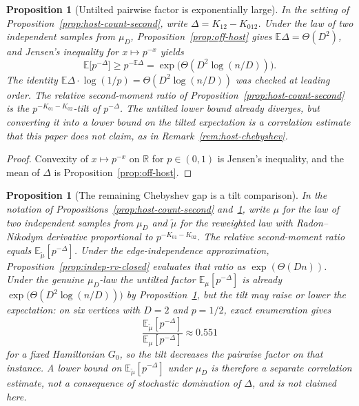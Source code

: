 \documentclass[11pt]{article}
\newtheorem{proposition}[theorem]{Proposition}
\newcommand{\EE}{\mathbb{E}}
\begin{document}
\begin{proposition}[Untilted pairwise factor is exponentially large]
\label{prop:untilted-tilt}
In the setting of Proposition~\ref{prop:host-count-second}, write
\(\Delta=K_{12}-K_{012}\).
Under the law of two independent samples from \(\mu_D\),
Proposition~\ref{prop:off-host} gives \(\EE\Delta=\Theta(D^2)\), and Jensen's
inequality for \(x\mapsto p^{-x}\) yields
\[
\EE\bigl[p^{-\Delta}\bigr]
\ge
p^{-\EE\Delta}
=
\exp\bigl(\Theta(D^2\log(n/D))\bigr).
\]
The identity \(\EE\Delta\cdot\log(1/p)=\Theta(D^2\log(n/D))\) was checked at
leading order.
The relative second-moment ratio of Proposition~\ref{prop:host-count-second}
is the \(p^{-K_{01}-K_{02}}\)-tilt of \(p^{-\Delta}\).
The untilted lower bound already diverges, but converting it into a lower bound
on the tilted expectation is a correlation estimate that this paper does not
claim, as in Remark~\ref{rem:host-chebyshev}.
\end{proposition}

\begin{proof}
Convexity of \(x\mapsto p^{-x}\) on \(\mathbb R\) for \(p\in(0,1)\) is Jensen's
inequality, and the mean of \(\Delta\) is Proposition~\ref{prop:off-host}.
\end{proof}

\begin{proposition}[The remaining Chebyshev gap is a tilt comparison]
\label{prop:tilt-gap}
In the notation of Propositions~\ref{prop:host-count-second}
and~\ref{prop:untilted-tilt}, write \(\mu\) for the law of two independent
samples from \(\mu_D\) and \(\widetilde\mu\) for the reweighted law with
Radon--Nikodym derivative proportional to \(p^{-K_{01}-K_{02}}\).
The relative second-moment ratio equals \(\EE_{\widetilde\mu}[p^{-\Delta}]\).
Under the edge-independence approximation,
Proposition~\ref{prop:indep-rv-closed} evaluates that ratio as
\(\exp(\Theta(Dn))\).
Under the genuine \(\mu_D\)-law the untilted factor
\(\EE_{\mu}[p^{-\Delta}]\) is already
\(\exp\bigl(\Theta(D^2\log(n/D))\bigr)\) by Proposition~\ref{prop:untilted-tilt},
but the tilt may raise or lower the expectation: on six vertices with
\(D=2\) and \(p=1/2\), exact enumeration gives
\[
\frac{\EE_{\widetilde\mu}[p^{-\Delta}]}{\EE_{\mu}[p^{-\Delta}]}
\approx
0.551
\]
for a fixed Hamiltonian \(G_0\), so the tilt decreases the pairwise factor on
that instance.
A lower bound on \(\EE_{\widetilde\mu}[p^{-\Delta}]\) under \(\mu_D\) is
therefore a separate correlation estimate, not a consequence of stochastic
domination of \(\Delta\), and is not claimed here.
\end{proposition}
\end{document}
